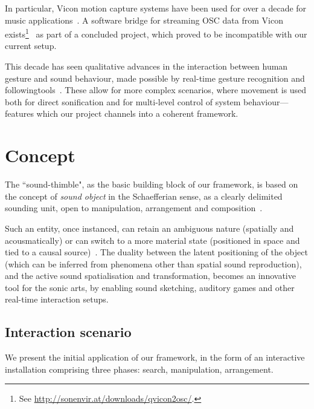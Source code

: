 In particular, Vicon motion capture systems have been used for over a decade for music applications~\cite{dobrian2003gestural,kapur2005framework,eckel2009motion,vigliensoni2012quantitative}. A software bridge for streaming OSC data from Vicon \linebreak exists\footnote{See \url{http://sonenvir.at/downloads/qvicon2osc/}.}~\cite{eckel2009motion} as part of a concluded project, which proved to be incompatible with our current setup.

This decade has seen qualitative advances in the interaction between human gesture and sound behaviour, made possible by real-time gesture recognition and following\linebreak tools~\cite{caramiaux2014mapping,caramiaux2015adaptive,probabilisticmodels}. These allow for more complex scenarios, where movement is used both for direct sonification and for multi-level control of system behaviour---features which our project channels into a coherent framework.

\section{Concept}
\label{sec:proj}


The ``sound-thimble", as the basic building block of our framework, is based on the concept of \textit{sound object} in the Schaefferian sense, as a clearly delimited sounding unit, open to manipulation, arrangement and composition~\cite{schaeffer1998solfege}.

Such an entity, once instanced, can retain an ambiguous nature (spatially and acousmatically) or can switch to a more material state (positioned in space and tied to a causal source)~\cite{soundunseen}. The duality between the latent positioning of the object (which can be inferred from phenomena other than spatial sound reproduction), and the active sound spatialisation and transformation, becomes an innovative tool for the sonic arts, by enabling sound sketching, auditory games and other real-time interaction setups.

\subsection{Interaction scenario}
\label{sec:scenario}

We present the initial application of our framework, in the form of an interactive installation comprising three phases: search, manipulation, arrangement.

